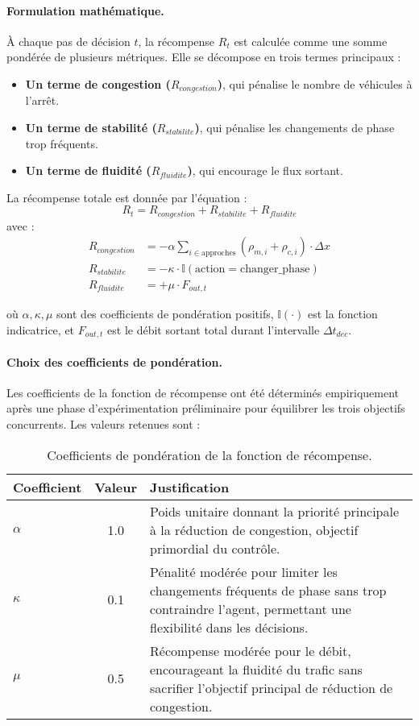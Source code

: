 \paragraph{Formulation mathématique.} À chaque pas de décision $t$, la récompense $R_t$ est calculée comme une somme pondérée de plusieurs métriques.
Elle se décompose en trois termes principaux :
\begin{itemize}
    \item \textbf{Un terme de congestion ($R_{congestion}$)}, qui pénalise le nombre de véhicules à l'arrêt.
    \item \textbf{Un terme de stabilité ($R_{stabilite}$)}, qui pénalise les changements de phase trop fréquents.
    \item \textbf{Un terme de fluidité ($R_{fluidite}$)}, qui encourage le flux sortant.
\end{itemize}
La récompense totale est donnée par l'équation :
\begin{equation}
R_t = R_{congestion} + R_{stabilite} + R_{fluidite}
\end{equation}
avec :
\begin{align}
R_{congestion} &= - \alpha \sum_{i \in \text{approches}} (\rho_{m,i} + \rho_{c,i}) \cdot \Delta x \\
R_{stabilite} &= - \kappa \cdot \mathbb{I}(\text{action} = \text{changer\_phase}) \\
R_{fluidite} &= + \mu \cdot F_{out, t}
\end{align}

où $\alpha, \kappa, \mu$ sont des coefficients de pondération positifs, $\mathbb{I}(\cdot)$ est la fonction indicatrice, et $F_{out, t}$ est le débit sortant total durant l'intervalle $\Delta t_{dec}$.

\paragraph{Choix des coefficients de pondération.}
Les coefficients de la fonction de récompense ont été déterminés empiriquement après une phase d'expérimentation préliminaire pour équilibrer les trois objectifs concurrents. Les valeurs retenues sont :

\begin{table}[h]
\centering
\begin{tabular}{lcp{8cm}}
\toprule
\textbf{Coefficient} & \textbf{Valeur} & \textbf{Justification} \\
\midrule
$\alpha$ & 1.0 & Poids unitaire donnant la priorité principale à la réduction de congestion, objectif primordial du contrôle. \\
$\kappa$ & 0.1 & Pénalité modérée pour limiter les changements fréquents de phase sans trop contraindre l'agent, permettant une flexibilité dans les décisions. \\
$\mu$ & 0.5 & Récompense modérée pour le débit, encourageant la fluidité du trafic sans sacrifier l'objectif principal de réduction de congestion. \\
\bottomrule
\end{tabular}
\caption{Coefficients de pondération de la fonction de récompense.}
\label{tab:reward_weights}
\end{table}

